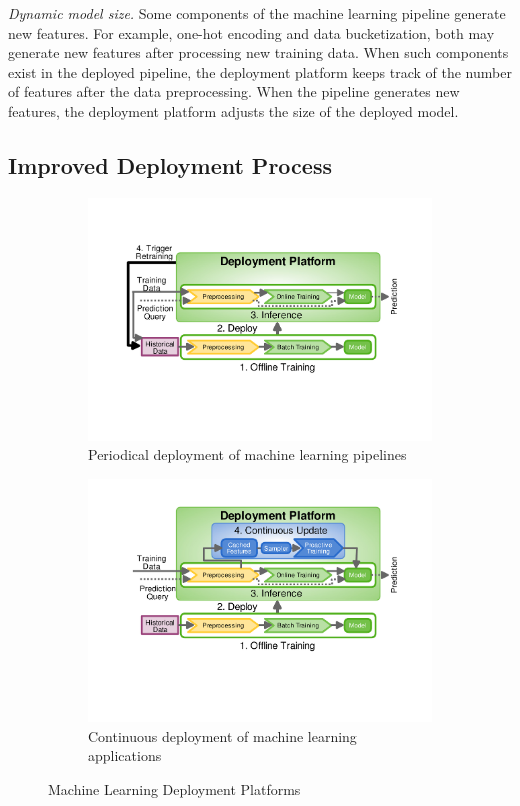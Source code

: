 \textit{Dynamic model size.}
Some components of the machine learning pipeline generate new features.
For example, one-hot encoding and data bucketization, both may generate new features after processing new training data.
When such components exist in the deployed pipeline, the deployment platform keeps track of the number of features after the data preprocessing.
When the pipeline generates new features, the deployment platform adjusts the size of the deployed model.

\subsection{Improved Deployment Process}
\begin{figure}[t]
\begin{subfigure}{\columnwidth}
\centering
\includegraphics[width=\columnwidth]{../images/generic-motivational-example-v2.pdf}
\caption{Periodical deployment of machine learning pipelines}
\label{fig:motivational-example}
\end{subfigure}%
\begin{subfigure}{\columnwidth}
\centering
\includegraphics[width=\columnwidth]{../images/generic-improved-example-v2.pdf}
\caption{Continuous deployment of machine learning applications}
\label{fig:improved-example}
\end{subfigure}
\caption{Machine Learning Deployment Platforms}
\end{figure}

